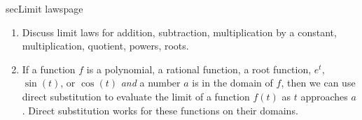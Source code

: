 \documentclass[../main.tex]{subfiles}
\begin{document}
\begin{outline}{sec}{Limit laws}{page}
  \label{outline:limit-laws}
  \begin{enumerate}
    \item Discuss limit laws for addition, subtraction, multiplication by a constant, multiplication,  quotient, powers, roots.

    \item If a function \(f\) is a polynomial, a rational function, a root function, \(e^{t}\), \(\sin(t)\), or \(\cos(t)\) \emph{and} a number \(a\) is in the domain of \(f\), then we can use direct substitution to evaluate the limit of a function \(f(t)\) as \(t\) approaches \(a\). Direct substitution works for these functions on their domains.
  \end{enumerate}
\end{outline}
\end{document}
